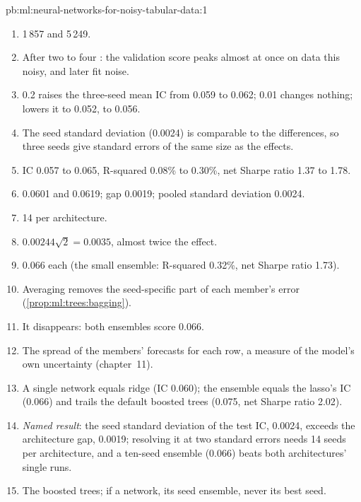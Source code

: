 \begin{solution}{pb:ml:neural-networks-for-noisy-tabular-data:1}
\begin{enumerate}
\item 1\,857 and 5\,249.
\item After two to four : the validation score peaks almost at once on data this noisy, and later  fit noise.
\item {} 0.2 raises the three-seed mean IC from 0.059 to 0.062;  0.01 changes nothing;  lowers it to 0.052,  to 0.056.
\item The seed standard deviation (0.0024) is comparable to the differences, so three seeds give standard errors of the
same size as the effects.
\item IC 0.057 to 0.065, R-squared 0.08\% to 0.30\%, net Sharpe ratio 1.37 to 1.78.
\item 0.0601 and 0.0619; gap 0.0019; pooled standard deviation 0.0024.
\item 14 per architecture.
\item $0.00244\sqrt2 = 0.0035$, almost twice the effect.
\item 0.066 each (the small ensemble: R-squared 0.32\%, net Sharpe ratio 1.73).
\item Averaging removes the seed-specific part of each member's error (\cref{prop:ml:trees:bagging}).
\item It disappears: both ensembles score 0.066.
\item The spread of the members' forecasts for each row, a measure of the model's own uncertainty (chapter~11).
\item A single network equals ridge (IC 0.060); the ensemble equals the lasso's IC (0.066) and trails the default boosted
trees (0.075, net Sharpe ratio 2.02).
\item \emph{Named result}: the seed standard deviation of the test IC, 0.0024, exceeds the architecture gap, 0.0019;
resolving it at two standard errors needs 14 seeds per architecture, and a ten-seed ensemble (0.066) beats both
architectures' single runs.
\item The boosted trees; if a network, its seed ensemble, never its best seed.

\end{enumerate}
\end{solution}
